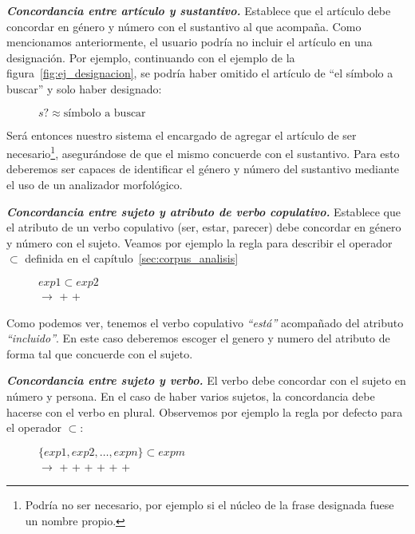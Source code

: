 \medskip
\noindent
\textbf{\emph{Concordancia entre artículo y sustantivo.}} Establece que el artículo debe concordar en género y número con el sustantivo al que acompaña.
\noindent
Como mencionamos anteriormente, el usuario podría no incluir el artículo en una designación. Por ejemplo, continuando con el ejemplo de la figura~\ref{fig:ej_designacion}, se podría haber omitido el artículo de ``el símbolo a buscar'' y solo haber designado:
\begin{figure}[H]
	\center
    $s? \approx \text{símbolo a buscar}$
\end{figure}
\noindent
Será entonces nuestro sistema el encargado de agregar el artículo de ser necesario\footnote{Podría no ser necesario, por ejemplo si el núcleo de la frase designada fuese un nombre propio.}, asegurándose de que el mismo concuerde con el sustantivo. Para esto deberemos ser capaces de identificar el género y número del sustantivo mediante el uso de un analizador morfológico.

\medskip
\noindent
\textbf{\emph{Concordancia entre sujeto y atributo de verbo copulativo.}} Establece que el atributo de un verbo copulativo (ser, estar, parecer) debe concordar en género y número con el sujeto.
\noindent
Veamos por ejemplo la regla para describir el operador $\subset$ definida en el capítulo~\ref{sec:corpus_analisis}

\begin{figure}[H]
	$exp1 \subset exp2$ \\
	\hspace*{0.56cm} $\rightarrow$  +  + 
\end{figure}
\noindent
Como podemos ver, tenemos el verbo copulativo \emph{``está''} acompañado del atributo \emph{``incluido''}. En este caso deberemos escoger el genero y numero del atributo de forma tal que concuerde con el sujeto.

\medskip
\noindent
\textbf{\emph{Concordancia entre sujeto y verbo.}} El verbo debe concordar con el sujeto en número y persona. En el caso de haber varios sujetos, la concordancia debe hacerse con el verbo en plural.
\noindent
Observemos por ejemplo la regla por defecto para el operador $\subset$:

\begin{figure}[H]
	$\{exp1, exp2, \ldots , expn\} \subset expm$ \\
	\hspace*{0.56cm} $\rightarrow$ + \nlgtext{,} +  +  +  +  + 
\end{figure}

